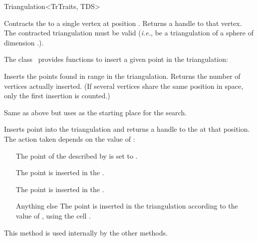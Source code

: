 \begin{ccRefClass}{Triangulation<TrTraits, TDS>}
\begin{ccAdvanced}

{Contracts the  to a single vertex at position . Returns a
handle to that vertex. \ccPrecond The contracted triangulation must be valid
(\emph{i.e.}, be a triangulation of a sphere of dimension
\ccVar.).}

\end{ccAdvanced}



The class \ccRefName\ provides functions to insert a given point in the
triangulation:

%
{Inserts the points found in range \ccc{[s,e)} in the triangulation. Returns
the number of vertices actually inserted. (If several vertices share the
same position in space, only the first insertion is counted.)}


%
{Same as above but uses  as the starting place for the search.}

\begin{ccAdvanced}

 {Inserts
point  into the triangulation and returns a handle to the
 at that position. The action taken depends on the value of
:\begin{itemize} \item[\ccc{ON_VERTEX}] The point of the
 described by  is set to . \item[\ccc{IN_FACE}]
The point  is inserted in the . \item[\ccc{IN_FACET}]
The point  is inserted in the . \item[Anything else]
The point  is inserted in the triangulation according to the value
of , using the cell .\end{itemize} This method is used
internally by the other  methods.}


\end{ccAdvanced}
\end{ccRefClass}
